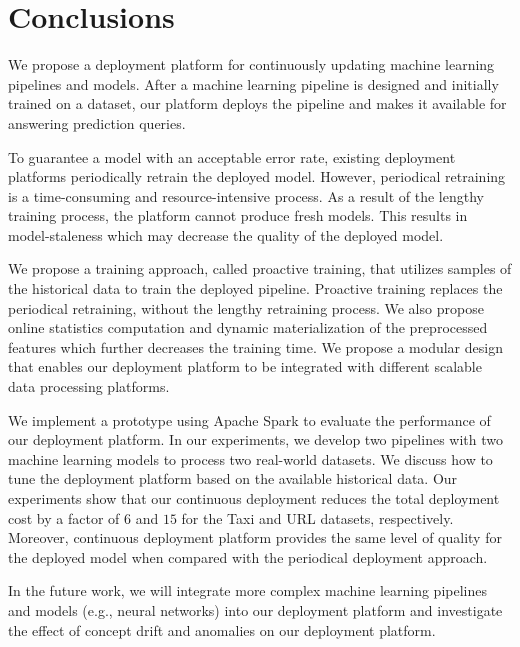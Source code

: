 \section{Conclusions} \label{conclusion}
We propose a deployment platform for continuously updating machine learning pipelines and models.
After a machine learning pipeline is designed and initially trained on a dataset, our platform deploys the pipeline and makes it available for answering prediction queries.

To guarantee a model with an acceptable error rate, existing deployment platforms periodically retrain the deployed model. 
However, periodical retraining is a time-consuming and resource-intensive process.
As a result of the lengthy training process, the platform cannot produce fresh models.
This results in model-staleness which may decrease the quality of the deployed model.

We propose a training approach, called proactive training, that utilizes samples of the historical data to train the deployed pipeline.
Proactive training replaces the periodical retraining,   without the lengthy retraining process.
We also propose online statistics computation and dynamic materialization of the preprocessed features which further decreases the training time.
We propose a modular design that enables our deployment platform to be integrated with different scalable data processing platforms.

We implement a prototype using Apache Spark to evaluate the performance of our deployment platform.
In our experiments, we develop two pipelines with two machine learning models to process two real-world datasets.
We discuss how to tune the deployment platform based on the available historical data.
Our experiments show that our continuous deployment reduces the total deployment cost by a factor of $6$ and $15$ for the Taxi and URL datasets, respectively.
Moreover, continuous deployment platform provides the same level of quality for the deployed model when compared with the periodical deployment approach.

In the future work, we will integrate more complex machine learning pipelines and models (e.g., neural networks) into our deployment platform and investigate the effect of concept drift and anomalies on our deployment platform.
\newline
{}

